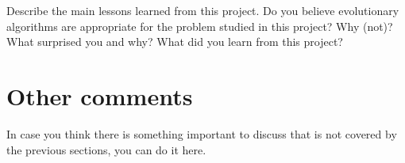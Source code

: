 \documentclass[a4paper,10pt]{article}
\newcommand{\ReplaceMe}[1]{{\color{blue}#1}}
\begin{document}
\ReplaceMe{Describe the main lessons learned from this project. Do you believe evolutionary algorithms are appropriate for the problem studied in this project? Why (not)? What surprised you and why? What did you learn from this project?}

\section{Other comments} \label{sec_other}

\ReplaceMe{In case you think there is something important to discuss that is not covered by the previous sections, you can do it here. }



\end{document}
